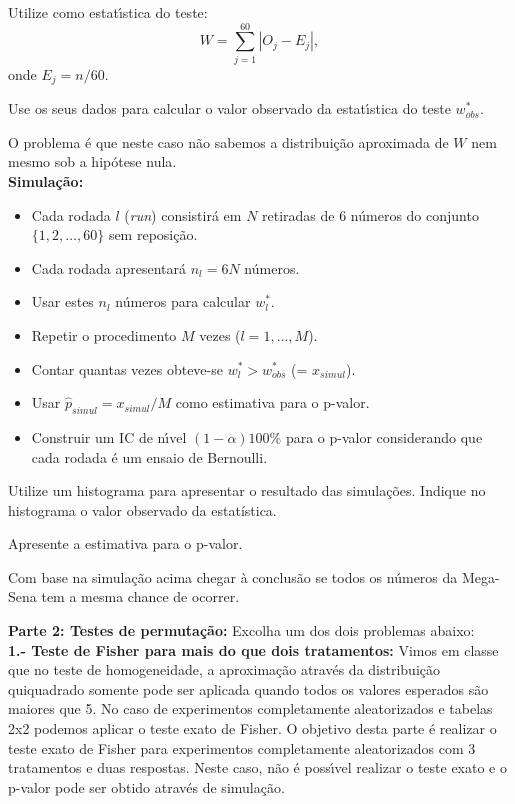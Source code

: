 \documentclass[12pt]{article}
\begin{document}
Utilize como estat\'\i stica do teste:
$$W = \sum_{j=1}^{60} |O_j - E_j|,$$
onde $E_j = n/60$. 

Use os seus dados para calcular o valor observado da estat\'\i stica
do teste $w^*_{obs}$. 

O problema \'e que neste caso n\~ao sabemos a distribui\c c\~ao
aproximada de $W$ nem mesmo sob a hip\'otese nula. \\

{\bf Simula\c c\~ao:} 
\begin{itemize}
\item Cada rodada $l$ ({\it run}) consistir\'a em $N$ retiradas de 6
  n\'umeros do conjunto $\{1,2,\ldots,60\}$ sem reposi\c c\~ao. 
\item Cada rodada apresentar\'a $n_l = 6N$ n\'umeros. 
\item Usar estes $n_l$ n\'umeros para calcular $w^*_{l}$.
\item Repetir o procedimento $M$ vezes ($l=1,\ldots,M$). 
\item  Contar quantas vezes obteve-se  $w^*_{l} > w^*_{obs}$ (= $x_{simul}$). 
\item Usar $\hat{p}_{simul} = x_{simul}/M$ como estimativa para o p-valor.
\item Construir um IC de n\'\i vel $(1-\alpha)100$\% para o p-valor
  considerando que cada rodada \'e um ensaio de Bernoulli.
\end{itemize}

Utilize um histograma para apresentar o resultado das simula\c c\~oes. Indique no histograma o valor observado da estat\'istica. 

Apresente a estimativa para o p-valor.

Com base na simula\c c\~ao acima chegar \`a conclus\~ao se todos os
n\'umeros da Mega-Sena tem a mesma chance de ocorrer. \\


\pagebreak


{\large \bf Parte 2: Testes de permuta\c c\~ao:} Excolha um dos dois problemas abaixo: \\

{\bf 1.- Teste de Fisher para mais do que dois tratamentos:} Vimos em classe que no teste de homogeneidade, a aproxima\c c\~ao atrav\' es da distribui\c c\~ao quiquadrado
somente pode ser aplicada quando todos os valores esperados s\~ao maiores que 5.
No caso de experimentos completamente aleatorizados e tabelas 2x2 podemos
aplicar o teste exato de Fisher. O objetivo desta parte \'e realizar o teste exato de Fisher para experimentos completamente aleatorizados com 3 tratamentos
e duas respostas. Neste caso, n\~ao \'e poss\'\i vel realizar o teste exato e
o p-valor pode ser obtido atrav\'es de simula\c c\~ao.
\end{document}
